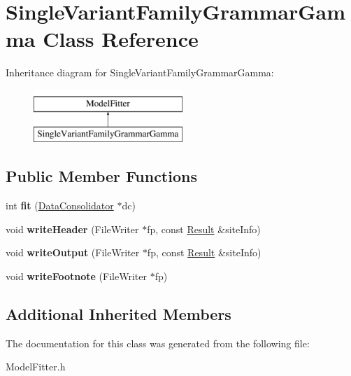 \hypertarget{classSingleVariantFamilyGrammarGamma}{\section{Single\-Variant\-Family\-Grammar\-Gamma Class Reference}
\label{classSingleVariantFamilyGrammarGamma}
}
Inheritance diagram for Single\-Variant\-Family\-Grammar\-Gamma\-:\begin{figure}[H]
\begin{center}
\leavevmode
\includegraphics[height=2.000000cm]{classSingleVariantFamilyGrammarGamma}
\end{center}
\end{figure}
\subsection*{Public Member Functions}
\begin{DoxyCompactItemize}
\item 
\hypertarget{classSingleVariantFamilyGrammarGamma_a3868ad08b97521ee952022bd31fef164}{int {\bfseries fit} (\hyperlink{classDataConsolidator}{Data\-Consolidator} $\ast$dc)}\label{classSingleVariantFamilyGrammarGamma_a3868ad08b97521ee952022bd31fef164}

\item 
\hypertarget{classSingleVariantFamilyGrammarGamma_ac5a1e16454019e83fe65382c695c4b4d}{void {\bfseries write\-Header} (File\-Writer $\ast$fp, const \hyperlink{classResult}{Result} \&site\-Info)}\label{classSingleVariantFamilyGrammarGamma_ac5a1e16454019e83fe65382c695c4b4d}

\item 
\hypertarget{classSingleVariantFamilyGrammarGamma_a5d3d41d262a4d627b7b87f0f7d0d4a1c}{void {\bfseries write\-Output} (File\-Writer $\ast$fp, const \hyperlink{classResult}{Result} \&site\-Info)}\label{classSingleVariantFamilyGrammarGamma_a5d3d41d262a4d627b7b87f0f7d0d4a1c}

\item 
\hypertarget{classSingleVariantFamilyGrammarGamma_aefda5b739ddb46c46db64d604c01202b}{void {\bfseries write\-Footnote} (File\-Writer $\ast$fp)}\label{classSingleVariantFamilyGrammarGamma_aefda5b739ddb46c46db64d604c01202b}

\end{DoxyCompactItemize}
\subsection*{Additional Inherited Members}


The documentation for this class was generated from the following file\-:\begin{DoxyCompactItemize}
\item 
Model\-Fitter.\-h\end{DoxyCompactItemize}
